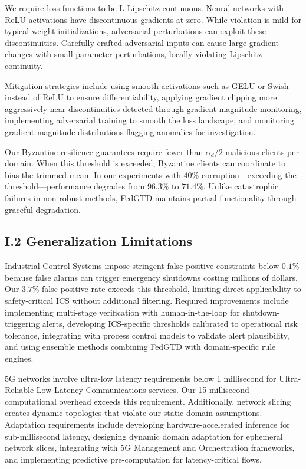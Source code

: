 \documentclass[12pt,a4paper]{article}
\theoremstyle{definition}
\begin{document}
We require loss functions to be L-Lipschitz continuous. Neural networks with ReLU activations have discontinuous gradients at zero. While violation is mild for typical weight initializations, adversarial perturbations can exploit these discontinuities. Carefully crafted adversarial inputs can cause large gradient changes with small parameter perturbations, locally violating Lipschitz continuity.

Mitigation strategies include using smooth activations such as GELU or Swish instead of ReLU to ensure differentiability, applying gradient clipping more aggressively near discontinuities detected through gradient magnitude monitoring, implementing adversarial training to smooth the loss landscape, and monitoring gradient magnitude distributions flagging anomalies for investigation.

\begingroup
\setlength{\emergencystretch}{2em}

Our Byzantine resilience guarantees require fewer than \(\alpha_d/2\) malicious clients per domain. When this threshold is exceeded, Byzantine clients can coordinate to bias the trimmed mean. In our experiments with \(40\%\) corruption—exceeding the threshold—performance degrades from \(96.3\%\) to \(71.4\%\). Unlike catastrophic failures in non-robust methods, FedGTD maintains partial functionality through graceful degradation.

\par\endgroup

\subsection{I.2 Generalization Limitations}

Industrial Control Systems impose stringent false-positive constraints below $0.1\%$ because false alarms can trigger emergency shutdowns costing millions of dollars. Our $3.7\%$ false-positive rate exceeds this threshold, limiting direct applicability to safety-critical ICS without additional filtering. Required improvements include implementing multi-stage verification with human-in-the-loop for shutdown-triggering alerts, developing ICS-specific thresholds calibrated to operational risk tolerance, integrating with process control models to validate alert plausibility, and using ensemble methods combining FedGTD with domain-specific rule engines.

5G networks involve ultra-low latency requirements below 1 millisecond for Ultra-Reliable Low-Latency Communications services. Our 15 millisecond computational overhead exceeds this requirement. Additionally, network slicing creates dynamic topologies that violate our static domain assumptions. Adaptation requirements include developing hardware-accelerated inference for sub-millisecond latency, designing dynamic domain adaptation for ephemeral network slices, integrating with 5G Management and Orchestration frameworks, and implementing predictive pre-computation for latency-critical flows.
\end{document}
